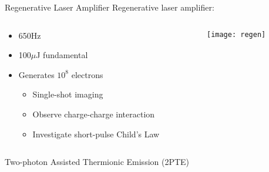 \begin{frame}{Regenerative Laser Amplifier}
  Regenerative laser amplifier:
  \begin{columns}
    \begin{column}{0.49\linewidth}
      \begin{itemize}
        \item 650Hz
        \item 100$\mu$J fundamental
        \item<2-> [$\hookrightarrow$] Generates $10^8$ electrons
        \begin{itemize}
          \item<3-> Single-shot imaging
          \item<4-> Observe charge-charge interaction
          \item<5-> Investigate short-pulse Child's Law
        \end{itemize}
      \end{itemize}
    \end{column}
    \begin{column}{0.49\linewidth}
    \begin{center}
      \texttt{[image: regen]}
    \end{center}
    \end{column}
  \end{columns}
\end{frame}

\begin{frame}{Two-photon Assisted Thermionic Emission (2PTE)}
  \begin{center}
    
  \end{center}
\end{frame} 
